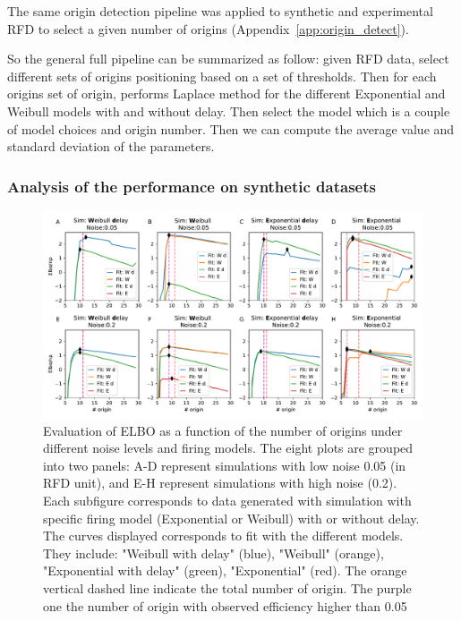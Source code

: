 \documentclass[10pt,a4paper]{revtex4-2}
\begin{document}
The same origin detection pipeline was applied to synthetic and experimental RFD to select a given number of origins (Appendix~\ref{app:origin_detect}).

So the general full pipeline can be summarized as follow: 
given RFD data, select different sets of origins positioning based on a set of thresholds.
Then for each origins set of origin, performs Laplace method for the different Exponential and Weibull models 
with and without delay. 
Then select the model which is a couple of model choices and origin number. 
Then we can compute the average value and standard deviation of the parameters.



\subsubsection{Analysis of the performance on synthetic datasets}

\begin{figure}
\includegraphics[width=1\textwidth]{figures/analyse-synthetic.pdf}
\caption{Evaluation of ELBO as a function of the number of origins under different noise levels and firing models.
The eight plots are grouped into two panels: A-D represent simulations with low noise 0.05 (in RFD unit), 
and E-H represent simulations with high noise (0.2). Each subfigure corresponds to data generated with simulation with specific firing model 
(Exponential or Weibull) with or without delay. The curves displayed corresponds to fit with the different models. They include: "Weibull with delay" (blue),
"Weibull" (orange), "Exponential with delay" (green), "Exponential" (red). The orange vertical dashed line indicate the total number of origin. 
The purple one the number of origin with observed efficiency higher than 0.05}\label{fig:synthetic}
\end{figure}
\end{document}
